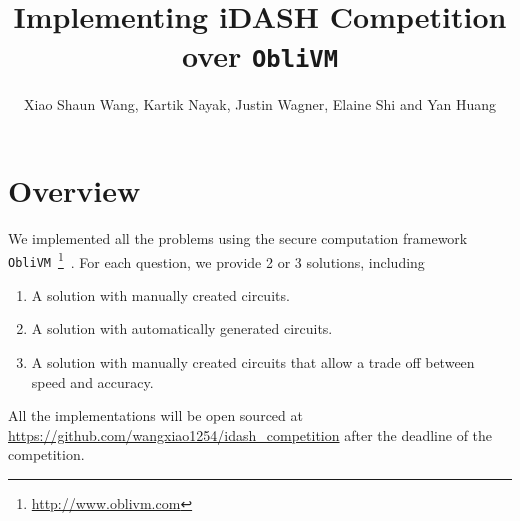 \documentclass{article}
\title{Implementing iDASH Competition over {\tt ObliVM}}
\author{Xiao Shaun Wang, Kartik Nayak, Justin Wagner, Elaine Shi and Yan Huang}
\begin{document}
\maketitle
\section{Overview}
We implemented all the problems using the secure computation framework {\tt ObliVM}~\footnote{\url{http://www.oblivm.com}}~\cite{oblivm}.
For each question, we provide 2 or 3 solutions, including
\begin{enumerate}
\item A solution with manually created circuits.
\item A solution with automatically generated circuits.
\item A solution with manually created circuits that allow a trade off between speed and accuracy.
\end{enumerate}

All the implementations will be open sourced at \url{https://github.com/wangxiao1254/idash_competition} after the deadline of the competition.


%


\end{document}
